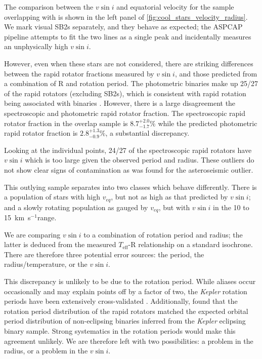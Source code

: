 \documentclass[preprint2]{aastex62}
\newcommand{\vsini}{\ensuremath{v \sin i}}
\newcommand{\Kepler}{\mbox{\textit{Kepler}}}
\newcommand{\Teff}{\ensuremath{T_{\textrm{eff}}}}
\newcommand{\kms}{\textrm{km~s}\ensuremath{^{-1}}}
\begin{document}
The comparison between the \vsini{} and equatorial velocity for the sample
overlapping with \citet{McQuillan14} is shown in the left panel of 
\cref{fig:cool_stars_velocity_radius}. We mark visual SB2s separately, and they 
behave as expected; the ASPCAP pipeline attempts to fit the two lines as a 
single peak and incidentally measures an unphysically high \vsini{}. 

However, even when these stars are not considered, there are striking
differences between the rapid rotator fractions measured by \vsini{}, and those
predicted from a combination of R and rotation period. The 
photometric binaries make up 25/27 of the rapid rotators (excluding SB2s), 
which is consistent with rapid rotation being associated with binaries 
\citep{Simonian19}. However, there is a large 
disagreement the spectroscopic and photometric rapid rotator fraction. The 
spectroscopic rapid rotator fraction
in the overlap sample is \(8.7^{+2.0}_{-1.7}\%\) while the predicted
photometric rapid rotator fraction is \(2.8^{+1.3}_{-0.9}\%\), a substantial
discrepancy.

Looking at the individual points, 24/27 of the spectroscopic rapid rotators 
have \vsini{} which is too large given the observed period and radius.
These outliers do not show clear signs of contamination as was found for the 
asteroseismic outlier.

This outlying sample separates into two classes which behave differently. There
is a population of stars with high \(v_{eq}\), but not as high as that
predicted by \vsini{}; and a slowly rotating population as gauged by
\(v_{eq}\), but with \vsini{} in the 10 to 15~\kms range. 

We are comparing
\vsini{} to a combination of rotation period and radius; the latter is deduced
from the measured \Teff{}-R relationship on a standard isochrone. There are
therefore three potential error sources: the period, the radius/temperature, or
the \vsini{}.


This discrepancy is unlikely to be due to the rotation period. While aliases
occur occasionally and may explain points off by a factor of two, the
\Kepler{} rotation periods have been extensively cross-validated
\citep{Aigrain15}. Additionally,
\citet{Simonian19} found that the rotation period distribution of the rapid
rotators matched the expected orbital period distribution of non-eclipsing
binaries inferred from the \Kepler{} eclipsing binary sample. Strong
systematics in the rotation periods would make this agreement unlikely. We are
therefore left with two possibilities: a problem in the radius, or a problem in
the \vsini.
\end{document}
